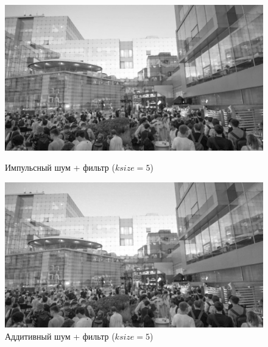 \documentclass[a4paper]{article}
\begin{document}
\begin{figure}[H]
    \begin{minipage}{0.49\textwidth}
        \centering \includegraphics[width=\textwidth]{images/3_nonlinear_filters/impulse - median (ksize=5).jpg}
        \caption{Импульсный шум + фильтр ($ksize = 5$)}
    \end{minipage}\hfill
    \begin{minipage}{0.49\textwidth}
        \centering \includegraphics[width=\textwidth]{images/3_nonlinear_filters/additive - median (ksize=5).jpg}
        \caption{Аддитивный шум + фильтр ($ksize = 5$)}
    \end{minipage}
\end{figure}
\end{document}
